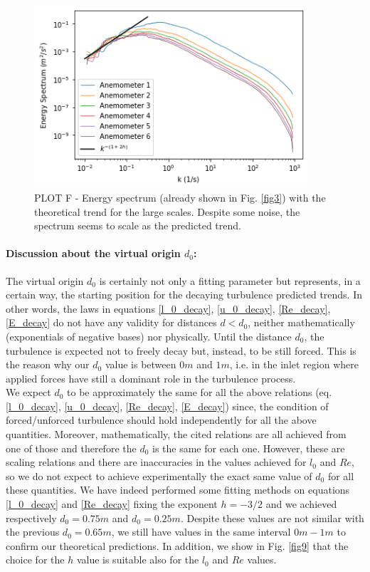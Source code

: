 \documentclass[11pt,titlepage]{article}
\begin{document}
 	\begin{center} 
 	\begin{figure} [h]
 		\centering
 		\includegraphics[width = 4in]{./figures/ex1_5_4.png}
 		\caption{PLOT F - Energy spectrum (already shown in Fig. \ref{fig3}) with the theoretical trend for the large scales. Despite some noise, the spectrum seems to scale as the predicted trend.}
 		\label{fig8}
 	\end{figure}
 \end{center}

\paragraph{Discussion about the virtual origin $d_0$:}
The virtual origin $d_0$ is certainly not only a fitting parameter but represents, in a certain way, the starting position for the decaying turbulence predicted trends. In other words, the laws in equations \ref{l_0_decay}, \ref{u_0_decay}, \ref{Re_decay}, \ref{E_decay} do not have any validity for distances $d < d_0$, neither mathematically (exponentials of negative bases) nor physically. Until the distance $d_0$, the turbulence is expected not to freely decay but, instead, to be still forced. This is the reason why our $d_0$ value is between $0m$ and $1m$, i.e. in the inlet region where applied forces have still a dominant role in the turbulence process. \\
We expect $d_0$ to be approximately the same for all the above relations (eq. \ref{l_0_decay}, \ref{u_0_decay}, \ref{Re_decay}, \ref{E_decay}) since, the condition of forced/unforced turbulence should hold independently for all the above quantities. Moreover, mathematically, the cited relations are all achieved from one of those and therefore the $d_0$ is the same for each one. However, these are scaling relations and there are inaccuracies in the values achieved for $l_0$ and $Re$, so we do not expect to achieve experimentally the exact same value of $d_0$ for all these quantities. We have indeed performed some fitting methods on equations \ref{l_0_decay} and \ref{Re_decay} fixing the exponent $h=-3/2$ and we achieved respectively $d_0 = 0.75m$ and $d_0 = 0.25m$. Despite these values are not similar with the previous $d_0 = 0.65m$, we still have values in the same interval $0m-1m$ to confirm our theoretical predictions. In addition, we show in Fig. \ref{fig9} that the choice for the $h$ value is suitable also for the $l_0$ and $Re$ values.
\end{document}
